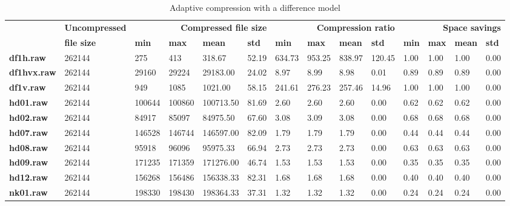 \begin{table}
\centering
\footnotesize
\begin{tabular}{l|l|llll|llll|llll}
     & \textbf{Uncompressed} & \multicolumn{4}{r|}{\textbf{Compressed file size}} & \multicolumn{4}{r|}{\textbf{Compression ratio}} & \multicolumn{4}{r}{\textbf{Space savings}} \\
     & \textbf{file size} & \textbf{min} & \textbf{max} & \textbf{mean} & \textbf{std} & \textbf{min} & \textbf{max} & \textbf{mean} & \textbf{std} & \textbf{min} & \textbf{max} & \textbf{mean} & \textbf{std} \\
\hline
    \textbf{df1h.raw} & 262144 & 275 & 413 & 318.67 & 52.19 & 634.73 & 953.25 & 838.97 & 120.45 & 1.00 & 1.00 & 1.00 & 0.00 \\
    \textbf{df1hvx.raw} & 262144 & 29160 & 29224 & 29183.00 & 24.02 & 8.97 & 8.99 & 8.98 & 0.01 & 0.89 & 0.89 & 0.89 & 0.00 \\
    \textbf{df1v.raw} & 262144 & 949 & 1085 & 1021.00 & 58.15 & 241.61 & 276.23 & 257.46 & 14.96 & 1.00 & 1.00 & 1.00 & 0.00 \\
    \textbf{hd01.raw} & 262144 & 100644 & 100860 & 100713.50 & 81.69 & 2.60 & 2.60 & 2.60 & 0.00 & 0.62 & 0.62 & 0.62 & 0.00 \\
    \textbf{hd02.raw} & 262144 & 84917 & 85097 & 84975.50 & 67.60 & 3.08 & 3.09 & 3.08 & 0.00 & 0.68 & 0.68 & 0.68 & 0.00 \\
    \textbf{hd07.raw} & 262144 & 146528 & 146744 & 146597.00 & 82.09 & 1.79 & 1.79 & 1.79 & 0.00 & 0.44 & 0.44 & 0.44 & 0.00 \\
    \textbf{hd08.raw} & 262144 & 95918 & 96096 & 95975.33 & 66.94 & 2.73 & 2.73 & 2.73 & 0.00 & 0.63 & 0.63 & 0.63 & 0.00 \\
    \textbf{hd09.raw} & 262144 & 171235 & 171359 & 171276.00 & 46.74 & 1.53 & 1.53 & 1.53 & 0.00 & 0.35 & 0.35 & 0.35 & 0.00 \\
    \textbf{hd12.raw} & 262144 & 156268 & 156486 & 156338.33 & 82.31 & 1.68 & 1.68 & 1.68 & 0.00 & 0.40 & 0.40 & 0.40 & 0.00 \\
    \textbf{nk01.raw} & 262144 & 198330 & 198430 & 198364.33 & 37.31 & 1.32 & 1.32 & 1.32 & 0.00 & 0.24 & 0.24 & 0.24 & 0.00 \\
\end{tabular}
\caption{Adaptive compression with a difference model}
\end{table}
